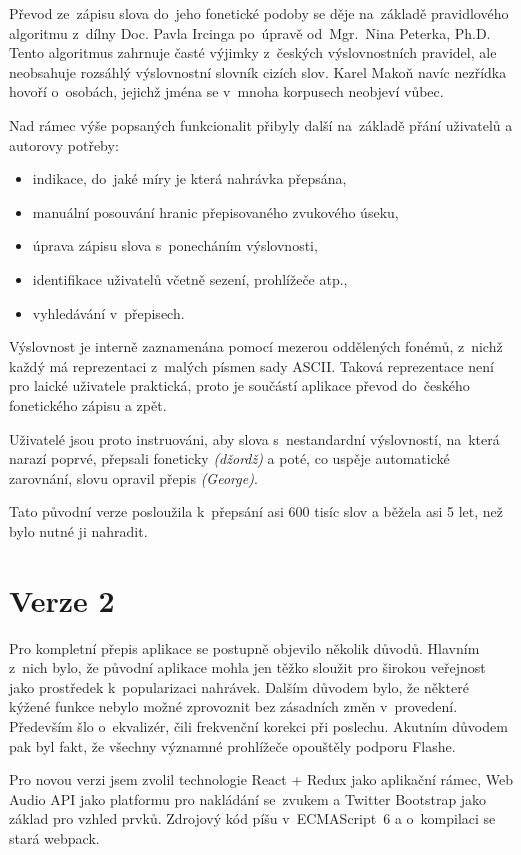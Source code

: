 Převod ze~zápisu slova do~jeho fonetické podoby se děje na~základě pravidlového
algoritmu z~dílny Doc. Pavla Ircinga po~úpravě od~Mgr.~Nina Peterka, Ph.D. Tento
algoritmus zahrnuje časté výjimky z~českých výslovnostních pravidel, ale
neobsahuje rozsáhlý výslovnostní slovník cizích slov. Karel Makoň navíc nezřídka
hovoří o~osobách, jejichž jména se v~mnoha korpusech neobjeví vůbec.

Nad rámec výše popsaných funkcionalit přibyly další na~základě přání uživatelů a
autorovy potřeby:

\begin{itemize}
\item{indikace, do~jaké míry je která nahrávka přepsána,}
\item{manuální posouvání hranic přepisovaného zvukového úseku,}
\item{úprava zápisu slova s~ponecháním výslovnosti,}
\item{identifikace uživatelů včetně sezení, prohlížeče atp.,}
\item{vyhledávání v~přepisech.}
\end{itemize}

Výslovnost je interně zaznamenána pomocí mezerou oddělených fonémů, z~nichž
každý má reprezentaci z~malých písmen sady ASCII. Taková reprezentace není pro
laické uživatele praktická, proto je součástí aplikace převod do~českého
fonetického zápisu a zpět.

Uživatelé jsou proto instruováni, aby slova s~nestandardní výslovností, na~která
narazí poprvé, přepsali foneticky \textit{(džordž)} a poté, co uspěje
automatické zarovnání, slovu opravil přepis \textit{(George)}.

Tato původní verze posloužila k~přepsání asi 600 tisíc slov a běžela asi 5 let,
než bylo nutné ji nahradit.

\section{Verze 2}

Pro kompletní přepis aplikace se postupně objevilo několik důvodů. Hlavním
z~nich bylo, že původní aplikace mohla jen těžko sloužit pro širokou veřejnost
jako prostředek k~popularizaci nahrávek. Dalším důvodem bylo, že některé kýžené
funkce nebylo možné zprovoznit bez zásadních změn v~provedení. Především šlo
o~ekvalizér, čili frekvenční korekci při poslechu. Akutním důvodem pak byl fakt,
že všechny významné prohlížeče opouštěly podporu Flashe.

Pro novou verzi jsem zvolil technologie React + Redux jako aplikační rámec, Web
Audio API jako platformu pro nakládání se~zvukem a Twitter Bootstrap jako základ
pro vzhled prvků. Zdrojový kód píšu v~ECMAScript~6 a o~kompilaci se stará
webpack.

